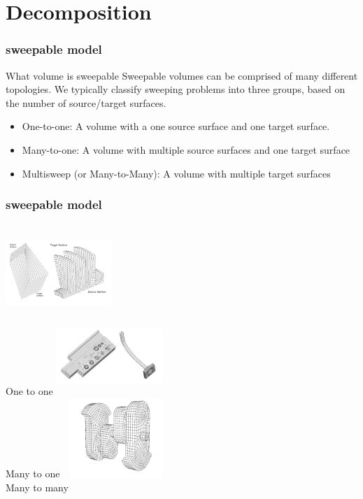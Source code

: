 \documentclass[fleqn]{beamer}
\begin{document}
\section{Decomposition}
\begin{frame}
\frametitle{sweepable model}
\begin{block}{What volume is sweepable}
 Sweepable volumes can be comprised of many
different topologies. We typically classify sweeping problems into three groups, based on the number of
source/target surfaces.
\begin{itemize}
 \item One-to-one: A volume with a one source surface and one target surface.
 \item Many-to-one: A volume with multiple source surfaces and one target surface
 \item Multisweep (or Many-to-Many): A volume with multiple target surfaces
\end{itemize}
\end{block}
\end{frame}

\begin{frame}
 \frametitle{sweepable model}
 \begin{columns}[t]
\centering
\includegraphics[width=4cm,height=3cm]{figures/one_to_one.png}\\{One to one}
\centering
\includegraphics[width=4cm,height=3cm]{figures/many_to_one.png}\\{Many to one}
\centering
\includegraphics[width=4cm,height=3cm]{figures/many_to_many.png}\\{Many to many}
\end{columns}
\end{frame}












\end{document}
